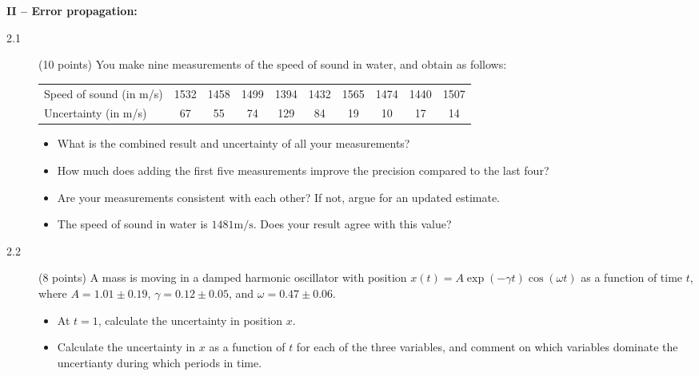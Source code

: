 \documentclass[11pt]{article}
\begin{document}
\vspace{2ex}
\noindent
{\bf II -- Error propagation:}
\vspace*{-1ex}
\begin{description}
\item[2.1] (10 points)
  You make nine measurements of the speed of sound in water, and obtain as follows:
  \vspace*{-2ex}
  \begin{center}
  \begin{tabular}{lccccccccc}
    \hline
    Speed of sound (in m/s)       &1532    &1458    &1499    &1394    &1432    &1565    &1474    &1440    &1507\\
    Uncertainty (in m/s)          &67      &55      &74      &129     &84      &19      &10      &17      &14\\
    \hline
  \end{tabular}
  \end{center}
  \vspace*{-3ex}
  \begin{itemize}
    \item What is the combined result and uncertainty of all your measurements?
    \item How much does adding the first five measurements improve the precision compared to the last four?
    \item Are your measurements consistent with each other? If not, argue for an updated estimate.
    \item The speed of sound in water is $1481 \mbox{m/s}$. Does your result agree with this value?
  \end{itemize}
%
\item[2.2] (8 points)
  A mass is moving in a damped harmonic oscillator with position $x(t) = A \exp(-\gamma t) \cos(\omega t)$
  as a function of time $t$, where $A = 1.01 \pm 0.19$, $\gamma = 0.12 \pm 0.05$, and $\omega = 0.47 \pm 0.06$.
  \vspace*{-1ex}
  \begin{itemize}
    \item At $t = 1$, calculate the uncertainty in position $x$.
    \item Calculate the uncertainty in $x$ as a function of $t$ for each of the three variables, and comment on
      which variables dominate the uncertianty during which periods in time.
  \end{itemize}
\end{description}
\end{document}
